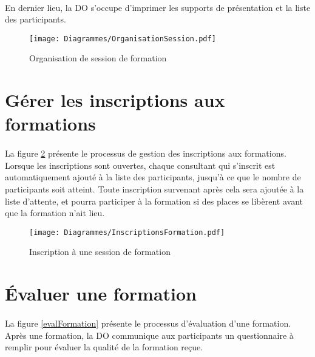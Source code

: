 \paragraph{} En dernier lieu, la DO s'occupe d'imprimer les supports de présentation et la liste des participants.
\begin{figure}[H]
	\centering
\begin{sideways}
	\texttt{[image: Diagrammes/OrganisationSession.pdf]}
\end{sideways}
	\caption{Organisation de session de formation} 
	\label{orgaForm}
\end{figure}




\section{Gérer les inscriptions aux formations}
\label{sec:inscriptions}
\paragraph{} La figure \ref{inscriptionForm} présente le processus de gestion des inscriptions aux formations. Lorsque les inscriptions sont ouvertes, chaque consultant qui s'inscrit est automatiquement ajouté à la liste des participants, jusqu'à ce que le nombre de participants soit atteint. Toute inscription survenant après cela sera ajoutée à la liste d'attente, et pourra participer à la formation si des places se libèrent avant que la formation n'ait lieu.


\begin{figure}[H]
\centering
	\texttt{[image: Diagrammes/InscriptionsFormation.pdf]}
	\caption{Inscription à une session de formation}
	\label{inscriptionForm}
\end{figure}


\section{Évaluer une formation}
\label{sec:eval}
\paragraph{} La figure \ref{evalFormation} présente le processus d'évaluation d'une formation. Après une formation, la DO communique aux participants un questionnaire à remplir pour évaluer la qualité de la formation reçue.
